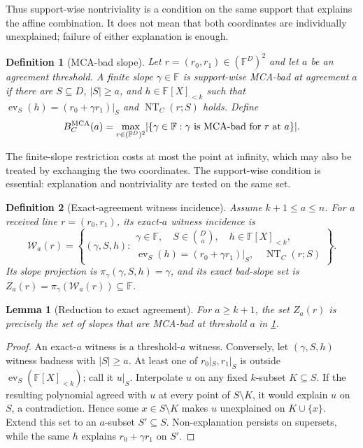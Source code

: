 \documentclass[12pt,a4paper]{amsart}
\numberwithin{equation}{section}
\newtheorem{lemma}[lemma]{Lemma}
\newtheorem{definition}[definition]{Definition}
\theoremstyle{remark}
\newcommand{\F}{\mathbb F}
\newcommand{\Wcal}{\mathcal W}
\newcommand{\abs}[1]{\lvert #1\rvert}
\begin{document}
Thus support-wise nontriviality is a condition on the same support that
explains the affine combination.  It does not mean that both coordinates
are individually unexplained; failure of either explanation is enough.

\begin{definition}[MCA-bad slope]\label{def:mca-bad}
Let \(r=(r_0,r_1)\in(\F^D)^2\) and let \(a\) be an agreement threshold.
A finite slope \(\gamma\in\F\) is support-wise MCA-bad at agreement \(a\)
if there are \(S\subseteq D\), \(\abs S\ge a\), and
\(h\in\F[X]_{<k}\) such that
\(\operatorname{ev}_S(h)=(r_0+\gamma r_1)|_S\) and
\(\operatorname{NT}_C(r;S)\) holds.  Define
\[
        B_C^{\rm MCA}(a)
        =\max_{r\in(\F^D)^2}\abs{\{\gamma\in\F:
          \gamma\text{ is MCA-bad for }r\text{ at }a\}}.
\]
\end{definition}

The finite-slope restriction costs at most the point at infinity, which may
also be treated by exchanging the two coordinates.  The support-wise
condition is essential: explanation and nontriviality are tested on the
same set.

\begin{definition}[Exact-agreement witness incidence]
\label{def:exact-witness-incidence}
Assume \(k+1\le a\le n\).  For a received line \(r=(r_0,r_1)\), its
exact-\(a\) witness incidence is
\[
 \Wcal_a(r)=\left\{(\gamma,S,h):
 \begin{array}{l}
   \gamma\in\F,\quad S\in\binom Da,\quad h\in\F[X]_{<k},\\
   \operatorname{ev}_S(h)=(r_0+\gamma r_1)|_S,\quad
   \operatorname{NT}_C(r;S)
 \end{array}\right\}.
 \tag{2.1}\label{eq:exact-witness-incidence}
\]
Its slope projection is
\(\pi_\gamma(\gamma,S,h)=\gamma\), and its exact bad-slope set is
\(Z_a(r)=\pi_\gamma(\Wcal_a(r))\subseteq\F\).
\end{definition}

\begin{lemma}[Reduction to exact agreement]
\label{lem:exact-agreement-reduction}
For \(a\ge k+1\), the set \(Z_a(r)\) is precisely the set of slopes that
are MCA-bad at threshold \(a\) in \cref{def:mca-bad}.
\end{lemma}

\begin{proof}
An exact-\(a\) witness is a threshold-\(a\) witness.  Conversely, let
\((\gamma,S,h)\) witness badness with \(\abs S\ge a\).  At least one of
\(r_0|_S,r_1|_S\) is outside
\(\operatorname{ev}_S(\F[X]_{<k})\); call it \(u|_S\).  Interpolate \(u\)
on any fixed \(k\)-subset \(K\subseteq S\).  If the resulting polynomial
agreed with \(u\) at every point of \(S\setminus K\), it would explain
\(u\) on \(S\), a contradiction.  Hence some \(x\in S\setminus K\)
makes \(u\) unexplained on \(K\cup\{x\}\).  Extend this set to an
\(a\)-subset \(S'\subseteq S\).  Non-explanation persists on supersets,
while the same \(h\) explains \(r_0+\gamma r_1\) on \(S'\).
\end{proof}
\end{document}
